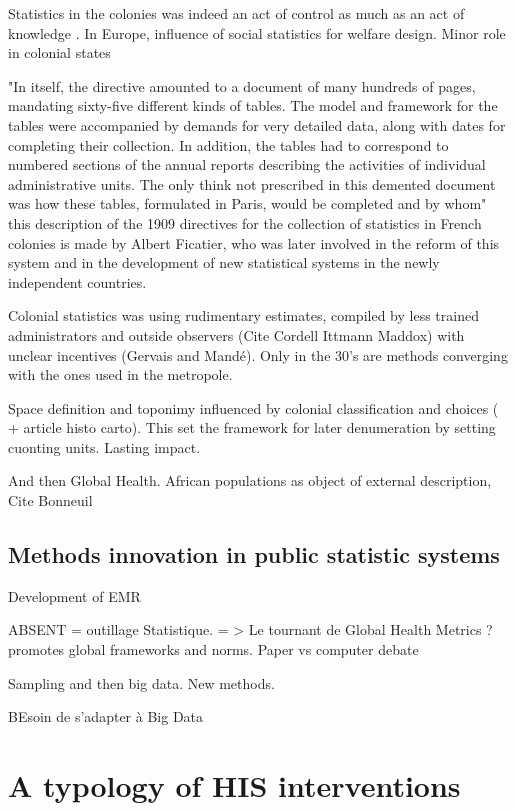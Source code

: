 \documentclass[letterpaper, 10 pt, conference]{IEEEconf}  %
\begin{document}
Statistics in the colonies was indeed an act of control as much as an act of knowledge \cite{appadurai_number_1996}. In Europe, influence of social statistics for welfare design. Minor role in colonial states \cite{cordell_couting_2010}

"In itself, the directive amounted to a document of many hundreds of pages, mandating sixty-five different kinds of tables. The model and framework for the tables were accompanied by demands for very detailed data, along with dates for completing their collection. In addition, the tables had to correspond to numbered sections of the annual reports describing the activities of individual administrative units. The only think not prescribed in this demented document was how these tables, formulated in Paris, would be completed and by whom" this description of the 1909 directives for the collection of statistics in French colonies is made by Albert Ficatier, who was later involved in the reform of this system and in the development of new statistical systems in the newly independent countries.

Colonial statistics was using rudimentary estimates, compiled by less trained administrators and outside observers (Cite Cordell Ittmann  Maddox) with unclear incentives (Gervais and Mandé). Only in the 30's are methods converging with the ones used in the metropole.

Space definition and toponimy influenced by colonial classification and choices (\cite{gervais_how_2010} + article histo carto). This set the framework for later denumeration by setting cuonting units. Lasting impact.

And then Global Health. African populations as object of external description, Cite Bonneuil

\subsection{Methods innovation in public statistic systems}

Development of EMR

ABSENT = outillage Statistique. = > Le tournant de Global Health Metrics ? \cite{health_metrics_network_framework_2008} promotes global frameworks and norms.
Paper vs computer debate

Sampling and then big data. New methods.

BEsoin de s'adapter à Big Data



\section{A typology of HIS interventions}
\end{document}
